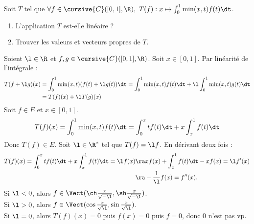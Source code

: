 \documentclass[11pt]{article}
\begin{document}
\begin{exercice}{}{}
    Soit $T$ tel que $\forall f \in \cursive{C}([0,1],\R), ~ T(f):x\mapsto \int_0^1\min(x,t)f(t)\dt$.
    \begin{enumerate}
        \item L'application $T$ est-elle linéaire ?
        \item Trouver les valeurs et vecteurs propres de $T$.
    \end{enumerate}
    \tcblower
     Soient $\l\in\R$ et $f,g\in\cursive{C}([0,1],\R)$. Soit $x\in[0,1]$. Par linéarité de l'intégrale :
    \begin{align*}
        T(f + \l g)(x) &= \int_0^1\min(x,t)(f(t)+\l g(t))\dt = \int_0^1\min(x,t)f(t)\dt + \l\int_0^1\min(x,t)g(t)\dt \\
        &= T(f)(x) + \l T(g)(x) 
    \end{align*}
     Soit $f\in E$ et $x\in[0,1]$.
    \begin{equation*}
        T(f)(x) = \int_0^1\min(x,t)f(t)\dt = \int_0^x tf(t)\dt + x\int_x^1 f(t)\dt
    \end{equation*} 
    Donc $T(f)\in E$. Soit $\l\in\R^*$ tel que $T(f)=\l f$. En dérivant deux fois :
    \begin{align*}
        T(f)(x) = \int_0^x tf(t)\dt + x\int_x^1 f(t)\dt = \l f(x) &\ra xf(x) + \int_x^1 f(t)\dt -xf(x)=\l f'(x)\\
        &\ra -\frac{1}{\l}f(x) = f''(x).
    \end{align*}
    Si $\l<0$, alors $f\in\Vect(\ch\frac{x}{\sqrt{-\l}}, \sh\frac{x}{\sqrt{-\l}})$.\\
    Si $\l>0$, alors $f\in\Vect(\cos\frac{x}{\sqrt{\l}}, \sin\frac{x}{\sqrt{\l}})$.\\
    Si $\l=0$, alors $T(f)(x)=0$ puis $f(x)=0$ puis $f=0$, donc 0 n'est pas vp.
\end{exercice}
\end{document}
